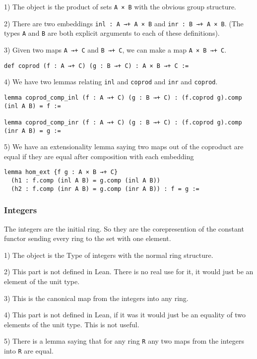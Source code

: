 \documentclass[12pt]{article} %
\theoremstyle{definition}
\theoremstyle{definition}
\theoremstyle{definition}
\theoremstyle{definition}
\begin{document}
1) The object is the product of sets \lstinline{A × B} with the obvious
group structure.

2) There are two embeddings \lstinline{inl : A →+ A × B} and
\lstinline{inr : B →+ A × B}. (The types \lstinline{A} and \lstinline{B}
are both explicit arguments to each of these definitions).

3) Given two maps \lstinline{A →+ C} and \lstinline{B →+ C}, we can make a map
\lstinline{A × B →+ C}.
\begin{lstlisting}
def coprod (f : A →+ C) (g : B →+ C) : A × B →+ C :=
\end{lstlisting}

4) We have two lemmas relating \lstinline{inl} and \lstinline{coprod} and \lstinline{inr}
and \lstinline{coprod}.
\begin{lstlisting}
lemma coprod_comp_inl (f : A →+ C) (g : B →+ C) : (f.coprod g).comp (inl A B) = f :=

lemma coprod_comp_inr (f : A →+ C) (g : B →+ C) : (f.coprod g).comp (inr A B) = g :=
\end{lstlisting}

5) We have an extensionality lemma saying two maps out of the coproduct are equal
if they are equal after composition with each embedding
\begin{lstlisting}
lemma hom_ext {f g : A × B →+ C}
  (h1 : f.comp (inl A B) = g.comp (inl A B))
  (h2 : f.comp (inr A B) = g.comp (inr A B)) : f = g :=
\end{lstlisting}

\subsubsection{Integers}
The integers are the initial ring. So they are the corepresention of the
constant functor sending every ring to the set with one element.

1) The object is the Type of integers with the normal ring structure.

2) This part is not defined in Lean. There is no real use for it, it would just be an element of
the unit type.

3) This is the canonical map from the integers into any ring.

4) This part is not defined in Lean, if it was it would just be an equality of two
elements of the unit type. This is not useful.

5) There is a lemma saying that for any ring \lstinline{R} any two maps from the integers into \lstinline{R}
are equal.
\end{document}
